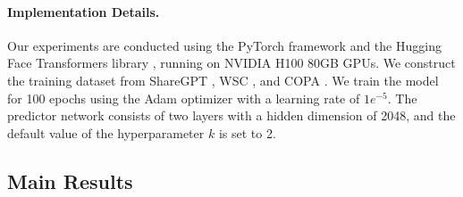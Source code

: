 \documentclass{article}
\begin{document}
\paragraph{Implementation Details.}
Our experiments are conducted using the PyTorch framework \citep{paszke2019pytorch} and the Hugging Face Transformers library \citep{wolf2020transformers}, running on NVIDIA H100 80GB GPUs. We construct the training dataset from ShareGPT \cite{chen2024sharegpt4v}, WSC \cite{levesque2012winograd}, and COPA \cite{roemmele2011choice}. We train the model for 100 epochs using the Adam optimizer with a learning rate of $1e^{-5}$. The predictor network consists of two layers with a hidden dimension of 2048, and the default value of the hyperparameter $k$ is set to 2.


\subsection{Main Results}

\end{document}
